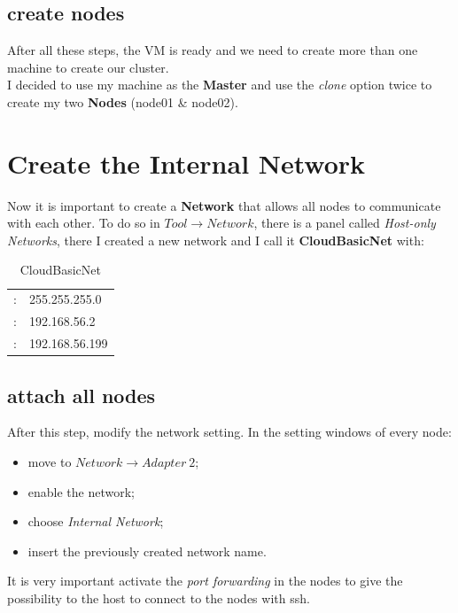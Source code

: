 \subsection{create nodes}
After all these steps, the VM is ready and we need to create more than one machine to create our cluster. \\
I decided to use my machine as the \textbf{Master} and use the \textit{clone} option twice to create my two \textbf{Nodes} (node01 \& node02).

\section{Create the Internal Network}

Now it is important to create a \textbf{Network} that allows all nodes to communicate with each other. To do so in $Tool \rightarrow Network$, there is a panel called \textit{Host-only Networks}, there I created a new network and I call it \textbf{CloudBasicNet} with:

\begin{table}[H]
    \centering
    \begin{tabular}{r|l}
        \color{UniOrange}{Mask}:        & 255.255.255.0  \\
        \color{UniOrange}{Lower Bound}: & 192.168.56.2   \\
        \color{UniOrange}{Upper Bound}: & 192.168.56.199
    \end{tabular}
    \caption{CloudBasicNet}
    \label{tab:ip_settings}
\end{table}

\subsection{attach all nodes}

After this step, modify the network setting. In the setting windows of every node:

\begin{itemize}
    \item move to $Network \rightarrow Adapter\ 2 $;
    \item enable the network;
    \item choose \textit{Internal Network};
    \item insert the previously created network name.
\end{itemize}

It is very important activate the \textit{port forwarding} in the nodes to give the possibility to the host to connect to the nodes with ssh.

